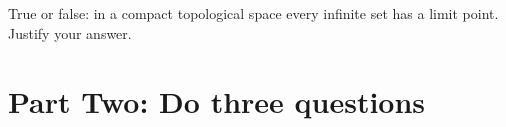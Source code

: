 \documentclass[12pt]{exam}
\theoremstyle{definition}
\newcommand{\R}{\mathcal{R}}
\def\R{{ \Bbb R}}
\begin{document}
\begin{questions}

\question

True or false: in a compact topological space every infinite set has
a limit point. Justify your answer.






\end{questions}

\section{Part Two: Do three questions}
\end{document}

